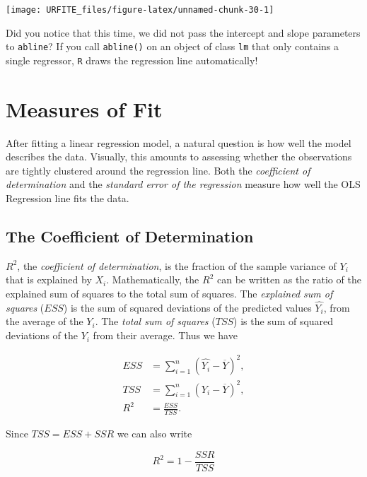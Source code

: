 \documentclass[]{book}
\theoremstyle{definition}
\theoremstyle{definition}
\theoremstyle{definition}
\theoremstyle{remark}
\begin{document}
\begin{center}\texttt{[image: URFITE\_files/figure-latex/unnamed-chunk-30-1]} \end{center}

Did you notice that this time, we did not pass the intercept and slope
parameters to \texttt{abline}? If you call \texttt{abline()} on an
object of class \texttt{lm} that only contains a single regressor,
\texttt{R} draws the regression line automatically!

\section{Measures of Fit}\label{measures-of-fit}

After fitting a linear regression model, a natural question is how well
the model describes the data. Visually, this amounts to assessing
whether the observations are tightly clustered around the regression
line. Both the \emph{coefficient of determination} and the
\emph{standard error of the regression} measure how well the OLS
Regression line fits the data.

\subsection*{The Coefficient of
Determination}\label{the-coefficient-of-determination}

\(R^2\), the \emph{coefficient of determination}, is the fraction of the
sample variance of \(Y_i\) that is explained by \(X_i\). Mathematically,
the \(R^2\) can be written as the ratio of the explained sum of squares
to the total sum of squares. The \emph{explained sum of squares}
(\(ESS\)) is the sum of squared deviations of the predicted values
\(\hat{Y_i}\), from the average of the \(Y_i\). The \emph{total sum of
squares} (\(TSS\)) is the sum of squared deviations of the \(Y_i\) from
their average. Thus we have

\begin{align}
  ESS & =  \sum_{i = 1}^n \left( \hat{Y_i} - \overline{Y} \right)^2,   \\
  TSS & =  \sum_{i = 1}^n \left( Y_i - \overline{Y} \right)^2,   \\
  R^2 & = \frac{ESS}{TSS}.
\end{align}

Since \(TSS = ESS + SSR\) we can also write

\[ R^2 = 1- \frac{SSR}{TSS} \]
\end{document}
